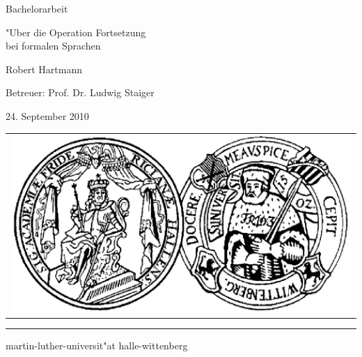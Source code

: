 \pagestyle{empty}

\begin{center}

{\Large\sc Bachelorarbeit}

\vspace{1.25cm}

{\fontsize{22}{22}\selectfont "Uber die Operation Fortsetzung\\bei formalen Sprachen}

\vspace{1.25cm}

{\Large\sc

Robert Hartmann

\vspace{.15cm}

Betreuer: Prof. Dr. Ludwig Staiger

\vspace{.15cm}

24. September 2010

}

\vspace{10.5cm}

\begin{tabular}{c}
	\includegraphics[height=15ex]{Bilder/siegel}
\end{tabular}

\vspace{0.5cm}

\rule{.7\textwidth}{.40pt}

\vspace{.2cm}

{\large\sc

martin-luther-universit"at halle-wittenberg

}

\end{center}

\cleardoublepage

